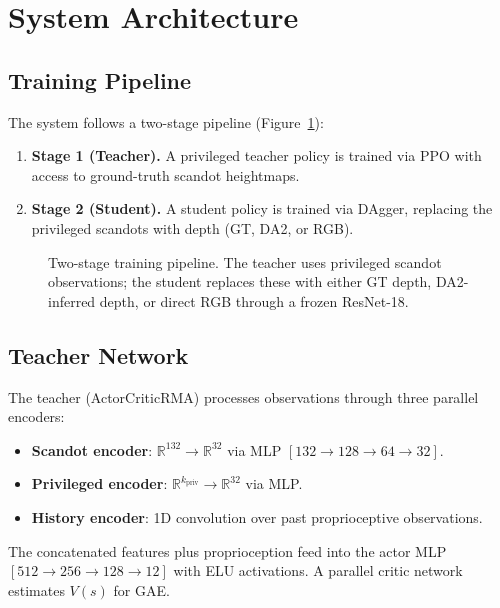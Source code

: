 \documentclass[10pt,twocolumn]{article}
\newcommand{\R}{\mathbb{R}}
\begin{document}
\section{System Architecture}
\label{sec:arch}

\subsection{Training Pipeline}

The system follows a two-stage pipeline (Figure~\ref{fig:pipeline}):
\begin{enumerate}
  \item \textbf{Stage 1 (Teacher).}  A privileged teacher policy is
    trained via PPO with access to ground-truth scandot heightmaps.
  \item \textbf{Stage 2 (Student).}  A student policy is trained via
    DAgger, replacing the privileged scandots with depth (GT, DA2, or
    RGB).
\end{enumerate}

\begin{figure}[t]
  \centering
  \caption{Two-stage training pipeline.  The teacher uses privileged
    scandot observations; the student replaces these with either GT depth,
  DA2-inferred depth, or direct RGB through a frozen ResNet-18.}
  \label{fig:pipeline}
\end{figure}

\subsection{Teacher Network}

The teacher (ActorCriticRMA) processes observations through three
parallel encoders:
\begin{itemize}
  \item \textbf{Scandot encoder}: $\R^{132} \to \R^{32}$ via MLP
    $[132 \to 128 \to 64 \to 32]$.
  \item \textbf{Privileged encoder}: $\R^{k_\text{priv}} \to \R^{32}$
    via MLP.
  \item \textbf{History encoder}: 1D convolution over past
    proprioceptive observations.
\end{itemize}
The concatenated features plus proprioception feed into the actor MLP
$[512 \to 256 \to 128 \to 12]$ with ELU activations.  A parallel
critic network estimates $V(s)$ for GAE.
\end{document}
